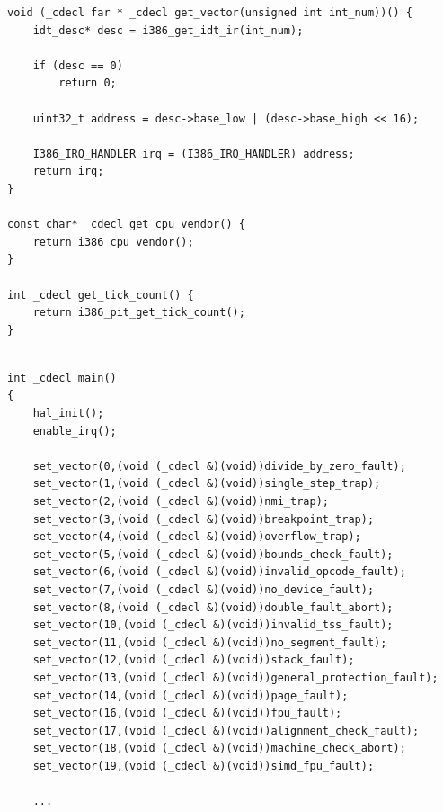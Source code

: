\documentclass[document.tex]{subfiles}
\begin{document}
\begin{english}
\begin{lstlisting}[label=lst:hal_impelmentation,caption=\en{New HAL Impelmentation}]
void (_cdecl far * _cdecl get_vector(unsigned int int_num))() {
	idt_desc* desc = i386_get_idt_ir(int_num);
	
	if (desc == 0)
		return 0;
		
	uint32_t address = desc->base_low | (desc->base_high << 16);
	
	I386_IRQ_HANDLER irq = (I386_IRQ_HANDLER) address;
	return irq;
}

const char* _cdecl get_cpu_vendor() {
	return i386_cpu_vendor();
}

int _cdecl get_tick_count() {
	return i386_pit_get_tick_count();
}


\end{lstlisting}
\end{english}

\begin{english}

\lstset{numberstyle=\tiny,numbers=left,stepnumber=1,numbersep=5pt,tabsize=2,extendedchars=true,breaklines=true,frame=b,showspaces=false, showtabs=false,xleftmargin=10pt,framexleftmargin=10pt,framexrightmargin=5pt,framexbottommargin=4pt,showstringspaces=false,language=C++}


\begin{lstlisting}[label=lst:main_function,caption=\en{kernel/main.cpp}]
int _cdecl main()
{
	hal_init();
	enable_irq();
	
	set_vector(0,(void (_cdecl &)(void))divide_by_zero_fault);
	set_vector(1,(void (_cdecl &)(void))single_step_trap);
	set_vector(2,(void (_cdecl &)(void))nmi_trap);
	set_vector(3,(void (_cdecl &)(void))breakpoint_trap);
	set_vector(4,(void (_cdecl &)(void))overflow_trap);
	set_vector(5,(void (_cdecl &)(void))bounds_check_fault);
	set_vector(6,(void (_cdecl &)(void))invalid_opcode_fault);
	set_vector(7,(void (_cdecl &)(void))no_device_fault);
	set_vector(8,(void (_cdecl &)(void))double_fault_abort);
	set_vector(10,(void (_cdecl &)(void))invalid_tss_fault);
	set_vector(11,(void (_cdecl &)(void))no_segment_fault);
	set_vector(12,(void (_cdecl &)(void))stack_fault);
	set_vector(13,(void (_cdecl &)(void))general_protection_fault);
	set_vector(14,(void (_cdecl &)(void))page_fault);
	set_vector(16,(void (_cdecl &)(void))fpu_fault);
	set_vector(17,(void (_cdecl &)(void))alignment_check_fault);
	set_vector(18,(void (_cdecl &)(void))machine_check_abort);
	set_vector(19,(void (_cdecl &)(void))simd_fpu_fault);

	...

\end{lstlisting}
\end{english}
\end{document}
